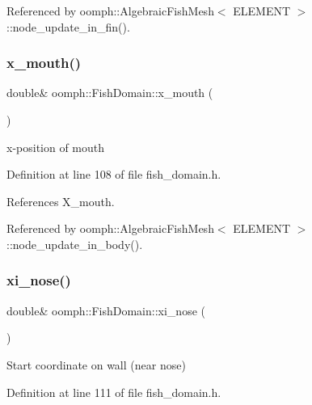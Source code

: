 Referenced by oomph\+::\+Algebraic\+Fish\+Mesh$<$ E\+L\+E\+M\+E\+N\+T $>$\+::node\+\_\+update\+\_\+in\+\_\+fin().

\mbox{\label{classoomph_1_1FishDomain_adf87e9ae261cc914173bc18d7eb5bfd8}} 
\subsubsection{\texorpdfstring{x\+\_\+mouth()}{x\_mouth()}}
{\footnotesize\ttfamily double\& oomph\+::\+Fish\+Domain\+::x\+\_\+mouth (\begin{DoxyParamCaption}{ }\end{DoxyParamCaption})\hspace{0.3cm}{\ttfamily [inline]}}



x-\/position of mouth 



Definition at line 108 of file fish\+\_\+domain.\+h.



References X\+\_\+mouth.



Referenced by oomph\+::\+Algebraic\+Fish\+Mesh$<$ E\+L\+E\+M\+E\+N\+T $>$\+::node\+\_\+update\+\_\+in\+\_\+body().

\mbox{\label{classoomph_1_1FishDomain_a773b98977806c2b27531425ecf5e3f8e}} 
\subsubsection{\texorpdfstring{xi\+\_\+nose()}{xi\_nose()}}
{\footnotesize\ttfamily double\& oomph\+::\+Fish\+Domain\+::xi\+\_\+nose (\begin{DoxyParamCaption}{ }\end{DoxyParamCaption})\hspace{0.3cm}{\ttfamily [inline]}}



Start coordinate on wall (near nose) 



Definition at line 111 of file fish\+\_\+domain.\+h.



